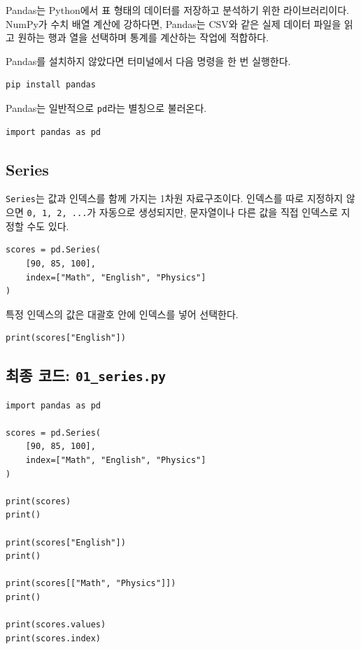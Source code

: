 \documentclass[11pt,a4paper]{article}
\begin{document}
Pandas는 Python에서 표 형태의 데이터를 저장하고 분석하기 위한 라이브러리이다. NumPy가 수치 배열 계산에 강하다면, Pandas는 CSV와 같은 실제 데이터 파일을 읽고 원하는 행과 열을 선택하며 통계를 계산하는 작업에 적합하다.

Pandas를 설치하지 않았다면 터미널에서 다음 명령을 한 번 실행한다.

\begin{verbatim}
pip install pandas
\end{verbatim}

Pandas는 일반적으로 \texttt{pd}라는 별칭으로 불러온다.

\begin{lstlisting}
import pandas as pd
\end{lstlisting}

\subsection{Series}

\texttt{Series}는 값과 인덱스를 함께 가지는 1차원 자료구조이다. 인덱스를 따로 지정하지 않으면 \texttt{0, 1, 2, ...}가 자동으로 생성되지만, 문자열이나 다른 값을 직접 인덱스로 지정할 수도 있다.

\begin{lstlisting}
scores = pd.Series(
    [90, 85, 100],
    index=["Math", "English", "Physics"]
)
\end{lstlisting}

특정 인덱스의 값은 대괄호 안에 인덱스를 넣어 선택한다.

\begin{lstlisting}
print(scores["English"])
\end{lstlisting}

\subsection{최종 코드: \texttt{01\_series.py}}

\begin{lstlisting}
import pandas as pd

scores = pd.Series(
    [90, 85, 100],
    index=["Math", "English", "Physics"]
)

print(scores)
print()

print(scores["English"])
print()

print(scores[["Math", "Physics"]])
print()

print(scores.values)
print(scores.index)
\end{lstlisting}
\end{document}
